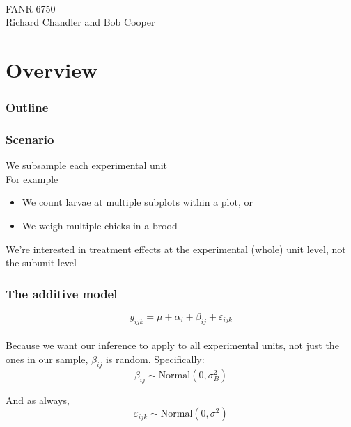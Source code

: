 \documentclass[color=usenames,dvipsnames]{beamer}\usepackage[]{graphicx}\usepackage[]{color}
\begin{document}



\begin{frame}[plain]
  \LARGE
  \centering
  {\color{RoyalBlue}{Lab 8 -- Nested Designs} \\}
  \vspace{1cm}
  \Large
  FANR 6750 \\
  \vfill
  \large
  Richard Chandler and Bob Cooper
\end{frame}







\section{Overview}



\begin{frame}
  \frametitle{Outline}
  \Large
\end{frame}




\begin{frame}
  \frametitle{Scenario}
  \large
  We subsample each experimental unit \\
  \pause
  \vfill
  For example
  \begin{itemize}
    \large
    \item We count larvae at multiple subplots within a plot, or
    \item We weigh multiple chicks in a brood
  \end{itemize}
  \pause
  \vfill
  We're interested in treatment effects at the experimental (whole) unit
  level, not the subunit level \\
\end{frame}




\begin{frame}
  \frametitle{The additive model}
  \large
\[
y_{ijk} = \mu + \alpha_i + \beta_{ij} + \varepsilon_{ijk}
\] \\
\vspace{1cm}
\pause
\large
Because we want our inference to apply to all experimental units, not
just the ones in our sample, $\beta_{ij}$ is random.
\pause
\vfill
Specifically:
\[
\beta_{ij} \sim \mbox{Normal}(0, \sigma^2_B)
\]

\pause
\large
And as always,
\[
\varepsilon_{ijk} \sim \mbox{Normal}(0, \sigma^2)
\]
\end{frame}
\end{document}
